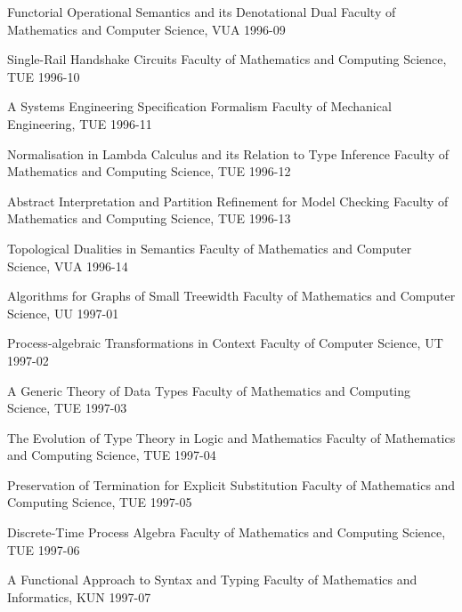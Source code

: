 \begin{multicols}{2}
         {Functorial Operational Semantics and its Denotational Dual}
         {Faculty of Mathematics and Computer Science, VUA}
         {1996-09}

         {Single-Rail Handshake Circuits}
         {Faculty of Mathematics and Computing Science, TUE}
         {1996-10}

         {A Systems Engineering Specification Formalism}
         {Faculty of Mechanical Engineering, TUE}
         {1996-11}

         {Normalisation in Lambda Calculus and its Relation to Type
Inference}
         {Faculty of Mathematics and Computing Science, TUE}
         {1996-12}

         {Abstract Interpretation and Partition Refinement for Model
Checking}
         {Faculty of Mathematics and Computing Science, TUE}
         {1996-13}

         {Topological Dualities in Semantics}
         {Faculty of Mathematics and Computer Science, VUA}
         {1996-14}

         {Algorithms for Graphs of Small Treewidth}
         {Faculty of Mathematics and Computer Science, UU}
         {1997-01}

         {Process-algebraic Transformations in Context}
         {Faculty of Computer Science, UT}
         {1997-02}

         {A Generic Theory of Data Types}
         {Faculty of Mathematics and Computing Science, TUE}
         {1997-03}

         {The Evolution of Type Theory in Logic and Mathematics}
         {Faculty of Mathematics and Computing Science, TUE}
         {1997-04}

         {Preservation of Termination for Explicit Substitution}
         {Faculty of Mathematics and Computing Science, TUE}
         {1997-05}

         {Discrete-Time Process Algebra}
         {Faculty of Mathematics and Computing Science, TUE}
         {1997-06}

         {A Functional Approach to Syntax and Typing}
         {Faculty of Mathematics and Informatics, KUN}
         {1997-07}


\end{multicols}
